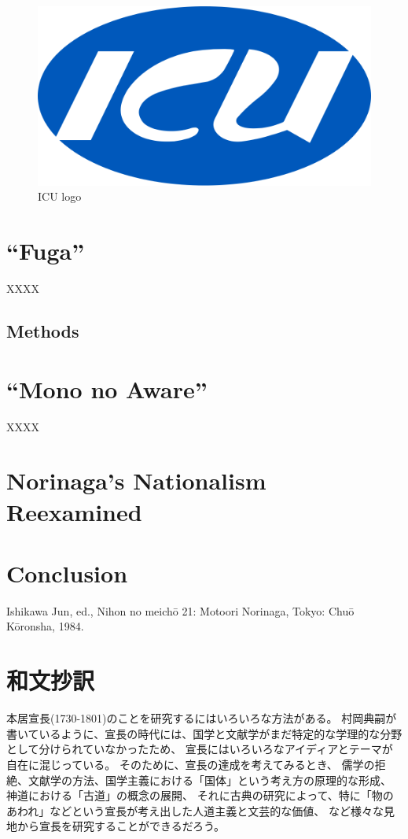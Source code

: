 \documentclass[12pt]{report}
\begin{document}
\begin{figure}[H]
    \begin{center}
    \includegraphics[width=\textwidth]{../figures/ICU_japan.png}
    \end{center}
    \caption{ICU logo}
    \label{1.1}
\end{figure}

\chapter{“Fuga”}
XXXX
\section{Methods}


\chapter{“Mono no Aware”}
XXXX

\chapter{Norinaga’s Nationalism Reexamined}

\chapter{Conclusion}
\begin{thebibliography}{99}


Ishikawa Jun, ed., Nihon no meichō 21: Motoori Norinaga, Tokyo: Chuō Kōronsha, 1984.
\end{thebibliography}
\chapter*{和文抄訳}
本居宣長(1730-1801)のことを研究するにはいろいろな方法がある。
村岡典嗣が書いているように、宣長の時代には、国学と文献学がまだ特定的な学理的な分野として分けられていなかったため、
宣長にはいろいろなアイディアとテーマが自在に混じっている。
そのために、宣長の達成を考えてみるとき、
儒学の拒絶、文献学の方法、国学主義における「国体」という考え方の原理的な形成、
神道における「古道」の概念の展開、
それに古典の研究によって、特に「物のあわれ」などという宣長が考え出した人道主義と文芸的な価値、
など様々な見地から宣長を研究することができるだろう。
\end{document}
